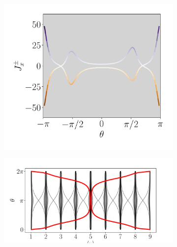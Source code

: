 \begin{figure}[h!]
     
     \begin{minipage}[h!]{1\textwidth}
         \begin{subfigure}[b!]{0.37 \textwidth}
             \caption{}
             \includegraphics[width=\textwidth]{Imagenes/Resultados_pump_Cuadrado/y/current_square_pump_pny.pdf}
             \label{}
         \end{subfigure}\hspace{-0.5em}
         \begin{subfigure}[b!]{0.63 \textwidth}
             \caption{}
             \includegraphics[width=\textwidth]{Imagenes/Resultados_pump_Cuadrado/y/wannier_centery.pdf}
             \label{}
         \end{subfigure}\hspace*{-0.5em}
     \end{minipage}\vspace*{-1em}
     
     
    \caption{}
    \label{fig:Pump_cuadrado_y}
\end{figure}